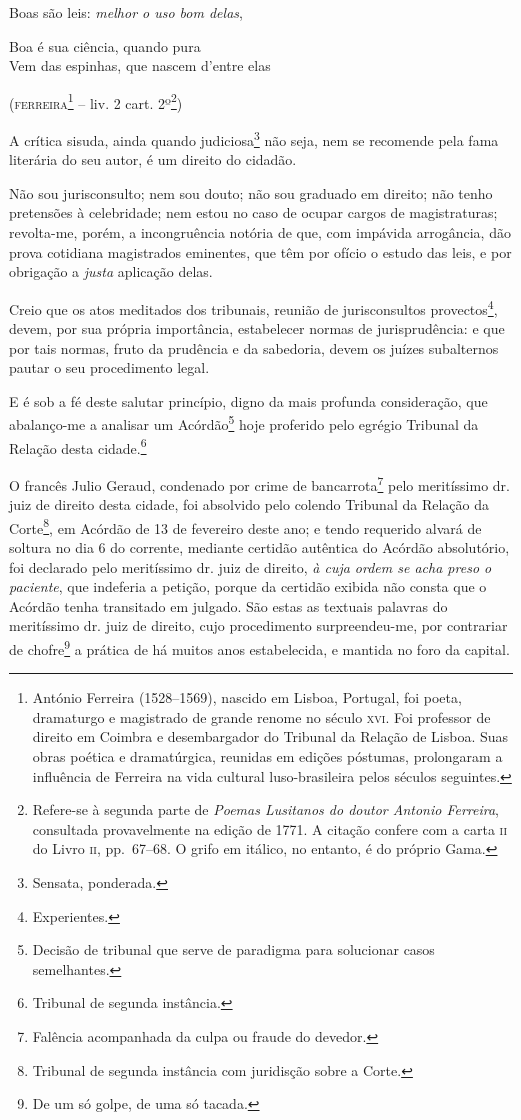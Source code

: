 Boas são leis: \emph{melhor o uso bom delas},

Boa é sua ciência, quando pura\\
Vem das espinhas, que nascem d'entre elas

(\textsc{ferreira}\footnote{ António Ferreira (1528--1569), nascido em Lisboa,
  Portugal, foi poeta, dramaturgo e magistrado de grande renome no
  século \textsc{xvi}. Foi professor de direito em Coimbra e desembargador do
  Tribunal da Relação de Lisboa. Suas obras poética e dramatúrgica,
  reunidas em edições póstumas, prolongaram a influência de Ferreira na
  vida cultural luso-brasileira pelos séculos seguintes.} -- liv. 2
cart. 2º\footnote{ Refere-se à segunda parte de \emph{Poemas Lusitanos
  do doutor Antonio Ferreira}, consultada provavelmente na edição de
  1771. A citação confere com a carta \textsc{ii} do Livro \textsc{ii}, pp.~67--68. O grifo
  em itálico, no entanto, é do próprio Gama.})

A crítica sisuda, ainda quando judiciosa\footnote{ Sensata, ponderada.}
não seja, nem se recomende pela fama literária do seu autor, é um
direito do cidadão.

Não sou jurisconsulto; nem sou douto; não sou graduado em direito; não
tenho pretensões à celebridade; nem estou no caso de ocupar cargos de
magistraturas; revolta-me, porém, a incongruência notória de que, com
impávida arrogância, dão prova cotidiana magistrados eminentes, que têm
por ofício o estudo das leis, e por obrigação a \emph{justa} aplicação
delas.

Creio que os atos meditados dos tribunais, reunião de jurisconsultos
provectos\footnote{ Experientes.}, devem, por sua própria importância,
estabelecer normas de jurisprudência: e que por tais normas, fruto da
prudência e da sabedoria, devem os juízes subalternos pautar o seu
procedimento legal.

E é sob a fé deste salutar princípio, digno da mais profunda
consideração, que abalanço-me a analisar um Acórdão\footnote{ Decisão
  de tribunal que serve de paradigma para solucionar casos semelhantes.}
hoje proferido pelo egrégio Tribunal da Relação desta cidade.\footnote{
  Tribunal de segunda instância.}

O francês Julio Geraud, condenado por crime de bancarrota\footnote{
  Falência acompanhada da culpa ou fraude do devedor.} pelo meritíssimo
dr. juiz de direito desta cidade, foi absolvido pelo colendo Tribunal da
Relação da Corte\footnote{ Tribunal de segunda instância com juridisção
  sobre a Corte.}, em Acórdão de 13 de fevereiro deste ano; e tendo
requerido alvará de soltura no dia 6 do corrente, mediante certidão
autêntica do Acórdão absolutório, foi declarado pelo meritíssimo dr.
juiz de direito, \emph{à cuja ordem se acha preso o paciente}, que
indeferia a petição, porque da certidão exibida não consta que o Acórdão
tenha transitado em julgado. São estas as textuais palavras do
meritíssimo dr. juiz de direito, cujo procedimento surpreendeu-me, por
contrariar de chofre\footnote{ De um só golpe, de uma só tacada.} a
prática de há muitos anos estabelecida, e mantida no foro da capital.

